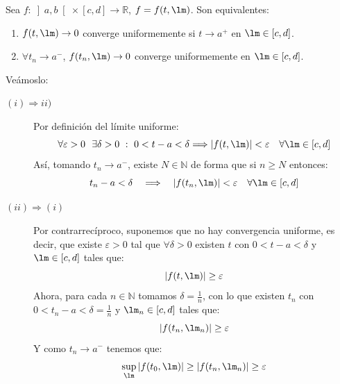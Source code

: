 \begin{ejercicio} %
    Sea $f:\left]a,b\right[\times [c,d]\to \mathbb{R}$, $f=f(t,\lm)$. Son equivalentes:
    \begin{enumerate}
        \item[$i)$] $f(t,\lm)\to 0$ converge uniformemente si $t\to a^+$ en $\lm \in [c,d]$.
        \item[$ii)$]$\forall t_n\to a^-$, $f(t_n,\lm)\to 0$ converge uniformemente en $\lm \in [c,d]$.
    \end{enumerate}
    Veámoslo:
    \begin{description}
        \item [$(i)\Longrightarrow  ii)$] Por definición del límite uniforme:
            \begin{equation*}
                \forall \varepsilon>0~~\exists \delta>0~:~ 0 < t-a<\delta \Longrightarrow  |f(t,\lm)| < \varepsilon\quad \forall \lm \in [c,d]
            \end{equation*}
            Así, tomando $t_n\to a^-$, existe $N\in \mathbb{N}$ de forma que si $n\geq N$ entonces:
            \begin{equation*}
                t_n-a < \delta \quad\Longrightarrow\quad |f(t_n,\lm)| < \varepsilon \quad \forall \lm \in [c,d]
            \end{equation*}
        \item [$(ii)\Longrightarrow (i)$]  Por contrarrecíproco, suponemos que no hay convergencia uniforme, es decir, que existe $\varepsilon>0$ tal que $\forall \delta>0$ existen $t$ con $0<t-a<\delta$ y $\lm \in [c,d]$ tales que:
            \begin{equation*}
                |f(t,\lm)| \geq \varepsilon
            \end{equation*}
            Ahora, para cada $n\in \mathbb{N}$ tomamos $\delta = \frac{1}{n}$, con lo que existen $t_n$ con $0<t_n-a<\delta = \frac{1}{n}$ y $\lm_n\in [c,d]$ tales que:
            \begin{equation*}
                |f(t_n,\lm_n)| \geq \varepsilon
            \end{equation*}
            Y como $t_n\to a^-$ tenemos que:
            \begin{equation*}
                \sup_{\lm} |f(t_0,\lm)| \geq |f(t_n,\lm_n)| \geq \varepsilon
            \end{equation*}
    \end{description}
\end{ejercicio}

